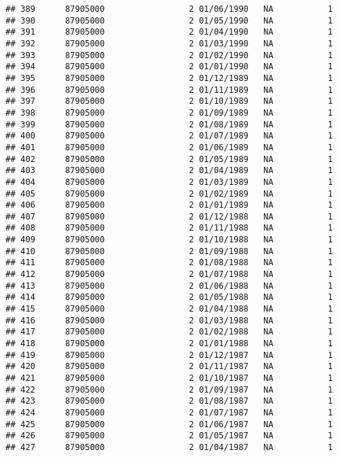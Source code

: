 \documentclass[
]{article}
\begin{document}
\begin{verbatim}
## 389      87905000                 2 01/06/1990   NA           1
## 390      87905000                 2 01/05/1990   NA           1
## 391      87905000                 2 01/04/1990   NA           1
## 392      87905000                 2 01/03/1990   NA           1
## 393      87905000                 2 01/02/1990   NA           1
## 394      87905000                 2 01/01/1990   NA           1
## 395      87905000                 2 01/12/1989   NA           1
## 396      87905000                 2 01/11/1989   NA           1
## 397      87905000                 2 01/10/1989   NA           1
## 398      87905000                 2 01/09/1989   NA           1
## 399      87905000                 2 01/08/1989   NA           1
## 400      87905000                 2 01/07/1989   NA           1
## 401      87905000                 2 01/06/1989   NA           1
## 402      87905000                 2 01/05/1989   NA           1
## 403      87905000                 2 01/04/1989   NA           1
## 404      87905000                 2 01/03/1989   NA           1
## 405      87905000                 2 01/02/1989   NA           1
## 406      87905000                 2 01/01/1989   NA           1
## 407      87905000                 2 01/12/1988   NA           1
## 408      87905000                 2 01/11/1988   NA           1
## 409      87905000                 2 01/10/1988   NA           1
## 410      87905000                 2 01/09/1988   NA           1
## 411      87905000                 2 01/08/1988   NA           1
## 412      87905000                 2 01/07/1988   NA           1
## 413      87905000                 2 01/06/1988   NA           1
## 414      87905000                 2 01/05/1988   NA           1
## 415      87905000                 2 01/04/1988   NA           1
## 416      87905000                 2 01/03/1988   NA           1
## 417      87905000                 2 01/02/1988   NA           1
## 418      87905000                 2 01/01/1988   NA           1
## 419      87905000                 2 01/12/1987   NA           1
## 420      87905000                 2 01/11/1987   NA           1
## 421      87905000                 2 01/10/1987   NA           1
## 422      87905000                 2 01/09/1987   NA           1
## 423      87905000                 2 01/08/1987   NA           1
## 424      87905000                 2 01/07/1987   NA           1
## 425      87905000                 2 01/06/1987   NA           1
## 426      87905000                 2 01/05/1987   NA           1
## 427      87905000                 2 01/04/1987   NA           1

\end{verbatim}
\end{document}
